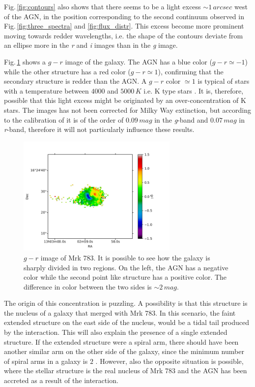 \documentclass[../main.tex]{subfiles}
\begin{document}
Fig.\,\ref{fig:contours} also shows that there seems to be a light excess $\sim 1\,\si{arcsec}$ west of the AGN, in the position corresponding to the second continuum observed in Fig.\,\ref{fig:three_spectra} and \ref{fig:flux_distr}.
This excess become more prominent moving towards redder wavelengths, i.e. the shape of the contours deviate from an ellipse more in the \emph{r} and \emph{i} images than in the \emph{g} image.

Fig.\,\ref{fig:mrk_gr} shows a $g-r$ image of the galaxy.
The AGN has a blue color ($g-r \simeq -1$) while the other structure has a red color ($g-r\simeq 1$), confirming that the secondary structure is redder than the AGN.
A $g-r$ color $\simeq 1$ is typical of stars with a temperature between $4000$ and $5000\,\si{K}$ i.e. K type stars \citep{Fukugita11}.
It is, therefore, possible that this light excess might be originated by an over-concentration of K stars.
The images has not been corrected for Milky Way extinction, but according to the calibration of \citet{Schlafly11} it is of the order of $0.09\,\si{mag}$ in the \emph{g}-band and $0.07\,\si{mag}$ in \emph{r}-band, therefore it will not particularly influence these results.

\begin{figure}
\centering
\includegraphics[width=0.7\textwidth]{images/paper3/mrk783color.jpg} 
\caption[]{$g-r$ image of Mrk 783. It is possible to see how the galaxy is sharply divided in two regions. On the left, the AGN has a negative color while the second point like structure has a positive color. The difference in color between the two sides is $\sim 2\,\si{mag}$.} 
\label{fig:mrk_gr}
\end{figure} 

The origin of this concentration is puzzling.
A possibility is that this structure is the nucleus of a galaxy that merged with Mrk 783. 
In this scenario, the faint extended structure on the east side of the nucleus, would be a tidal tail produced by the interaction.
This will also explain the presence of a single extended structure.
If the extended structure were a spiral arm, there should have been another similar arm on the other side of the galaxy, since the minimum number of spiral arms in a galaxy is $2$ \citep{Donghia15}.
However, also the opposite situation is possible, where the stellar structure is the real nucleus of Mrk 783 and the AGN has been accreted as a result of the interaction.
\end{document}
